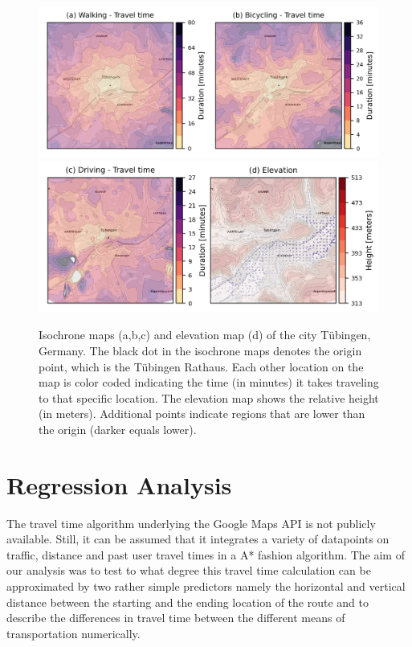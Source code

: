 \documentclass{article}
\begin{document}
\begin{figure}
  \centering
  \includegraphics[width=\linewidth]{fig/RegionDisplayer_WalkingBicycling.png}
  \includegraphics[width=\linewidth]{fig/RegionDisplayer_DrivingElevation.png}
  \caption{Isochrone maps (a,b,c) and elevation map (d) of the city Tübingen, Germany. The black dot in the isochrone maps denotes the origin point, which is the Tübingen Rathaus. Each other location on the map is color coded indicating the time (in minutes) it takes traveling to that specific location. The elevation map shows the relative height (in meters). Additional points indicate regions that are lower than the origin (darker equals lower).}
  \label{fig:maps}
\end{figure}

\section{Regression Analysis}

The travel time algorithm underlying the Google Maps API is not publicly available. Still, it can be assumed that it integrates a variety of datapoints on traffic, distance and past user travel times in a A* fashion algorithm. The aim of our analysis was to test to what degree this travel time calculation can be approximated by two rather simple predictors namely the horizontal and vertical distance between the starting and the ending location of the route and to describe the differences in travel time between the different means of transportation numerically.
\end{document}
